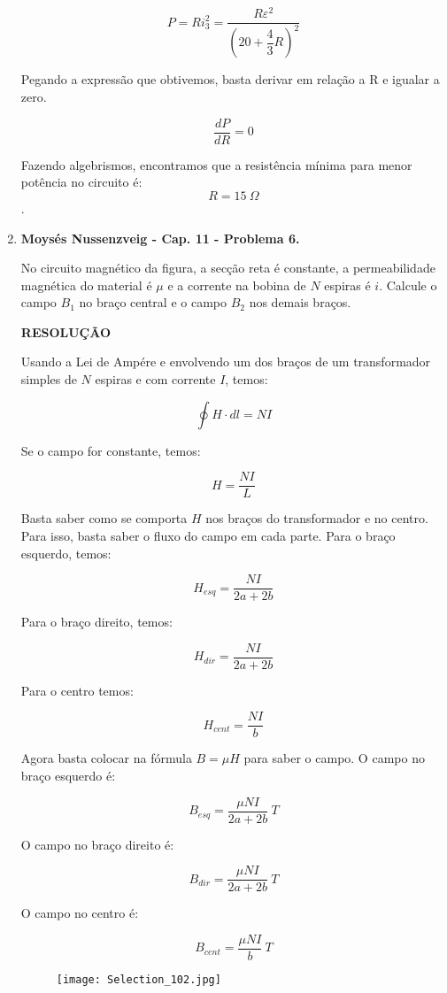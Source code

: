 \documentclass[11pt,a4paper]{article}
\begin{document}
\begin{enumerate}
$$P = R i_3^2 = \displaystyle\dfrac{R \varepsilon^2}{\left( 20 + \displaystyle\dfrac{4}{3} R\right)^2}$$

Pegando a expressão que obtivemos, basta derivar em relação a R e igualar a zero. 

$$\displaystyle\dfrac{dP}{dR} = 0$$

Fazendo algebrismos, encontramos que a resistência mínima para menor potência no circuito é:
$$R = 15 \ \Omega$$.

\item \textbf{Moysés Nussenzveig - Cap. 11 - Problema 6.}

No circuito magnético da figura, a secção reta é constante, a permeabilidade magnética do material é $\mu$ e a corrente na bobina de $N$ espiras é $i$. Calcule o campo $B_1$ no braço central e o campo $B_2$ nos demais braços. 

\textbf{RESOLUÇÃO}

Usando a Lei de Ampére e envolvendo um dos braços de um transformador simples de $N$ espiras e com corrente $I$, temos:

$$\displaystyle\oint H \cdot dl = NI$$

Se o campo for constante, temos:

$$H = \displaystyle\dfrac{NI}{L}$$

Basta saber como se comporta $H$ nos braços do transformador e no centro. Para isso, basta saber o fluxo do campo em cada parte. Para o braço esquerdo, temos:

$$H_{esq} = \displaystyle\dfrac{NI}{2a + 2b}$$

Para o braço direito, temos:

$$H_{dir} = \displaystyle\dfrac{NI}{2a + 2b}$$

Para o centro temos:

$$H_{cent} = \displaystyle\dfrac{NI}{b}$$

Agora basta colocar na fórmula $B = \mu H$ para saber o campo. O campo no braço esquerdo é:

$$B_{esq} = \displaystyle\dfrac{\mu NI}{2a + 2b} \ T$$

O campo no braço direito é:

$$B_{dir} = \displaystyle\dfrac{\mu NI}{2a + 2b} \ T$$

O campo no centro é:

$$B_{cent} = \displaystyle\dfrac{\mu NI}{b} \ T$$

\begin{figure}[h]	
\centering %
\texttt{[image: Selection\_102.jpg]} 
\end{figure}


















\end{enumerate}
	
\end{document}
